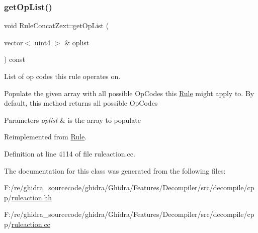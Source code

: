 \subsubsection{\texorpdfstring{getOpList()}{getOpList()}}
{\footnotesize\ttfamily void Rule\+Concat\+Zext\+::get\+Op\+List (\begin{DoxyParamCaption}\item[{vector$<$ uint4 $>$ \&}]{oplist }\end{DoxyParamCaption}) const\hspace{0.3cm}{\ttfamily [virtual]}}



List of op codes this rule operates on. 

Populate the given array with all possible Op\+Codes this \mbox{\hyperlink{class_rule}{Rule}} might apply to. By default, this method returns all possible Op\+Codes 
\begin{DoxyParams}{Parameters}
{\em oplist} & is the array to populate \\
\hline
\end{DoxyParams}


Reimplemented from \mbox{\hyperlink{class_rule_a4023bfc7825de0ab866790551856d10e}{Rule}}.



Definition at line 4114 of file ruleaction.\+cc.



The documentation for this class was generated from the following files\+:\begin{DoxyCompactItemize}
\item 
F\+:/re/ghidra\+\_\+sourcecode/ghidra/\+Ghidra/\+Features/\+Decompiler/src/decompile/cpp/\mbox{\hyperlink{ruleaction_8hh}{ruleaction.\+hh}}\item 
F\+:/re/ghidra\+\_\+sourcecode/ghidra/\+Ghidra/\+Features/\+Decompiler/src/decompile/cpp/\mbox{\hyperlink{ruleaction_8cc}{ruleaction.\+cc}}\end{DoxyCompactItemize}
